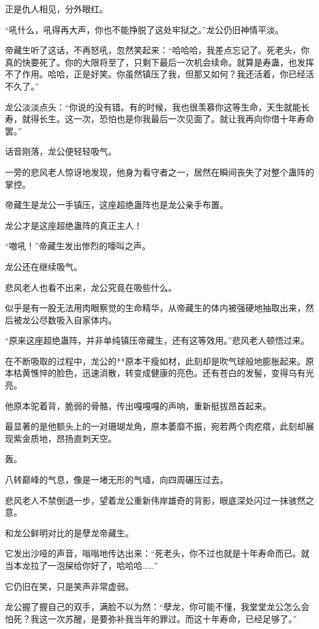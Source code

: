 \begin{this_body}
正是仇人相见，分外眼红。

“吼什么，吼得再大声，你也不能挣脱了这处牢狱之。”龙公仍旧神情平淡。

帝藏生听了这话，不再怒吼，忽然笑起来：“哈哈哈，我差点忘记了。死老头，你真的快要死了。你的大限将至了，只剩下最后一次机会续命。就算是寿蛊，也发挥不了作用。哈哈，正是好笑。你虽然镇压了我，但那又如何？我还活着，你已经活不久了。”

龙公淡淡点头：“你说的没有错。有的时候，我也很羡慕你这等生命，天生就能长寿，就得长生。这一次，恐怕也是你我最后一次见面了。就让我再向你借十年寿命罢。”

话音刚落，龙公便轻轻吸气。

一旁的悲风老人惊讶地发现，他身为看守者之一，居然在瞬间丧失了对整个蛊阵的掌控。

帝藏生是龙公一手镇压，这座超绝蛊阵也是龙公亲手布置。

龙公才是这座超绝蛊阵的真正主人！

“嗷吼！”帝藏生发出惨烈的嚎叫之声。

龙公还在继续吸气。

悲风老人也看不出来，龙公究竟在吸些什么。

似乎是有一股无法用肉眼察觉的生命精华，从帝藏生的体内被强硬地抽取出来，然后被龙公尽数吸入自家体内。

“原来这座超绝蛊阵，并非单纯镇压帝藏生，还有这等效用。”悲风老人顿悟过来。

在不断吸取的过程中，龙公的**原本干瘦如材，此刻却是吹气球般地膨胀起来。原本枯黄憔悴的脸色，迅速消散，转变成健康的亮色。还有苍白的发髻，变得乌有光亮。

他原本驼着背，脆弱的骨骼，传出嘎嘎嘎的声响，重新挺拔昂首起来。

最显著的是他额头上的一对珊瑚龙角，原本萎靡不振，宛若两个肉疙瘩，此刻却展现紫金质地，昂扬直刺天空。

轰。

八转巅峰的气息，像是一堵无形的气墙，向四周碾压过去。

悲风老人不禁倒退一步，望着龙公重新伟岸雄奇的背影，眼底深处闪过一抹骇然之意。

和龙公鲜明对比的是孽龙帝藏生。

它发出沙哑的声音，嗡嗡地传达出来：“死老头，你不过也就是十年寿命而已。就当本龙拉了一泡屎给你好了，哈哈哈……”

它仍旧在笑，只是笑声非常虚弱。

龙公握了握自己的双手，满脸不以为然：“孽龙，你可能不懂，我堂堂龙公怎么会怕死？我这一次苏醒，是要弥补我当年的罪过。而这十年寿命，已经足够了。”


\end{this_body}
